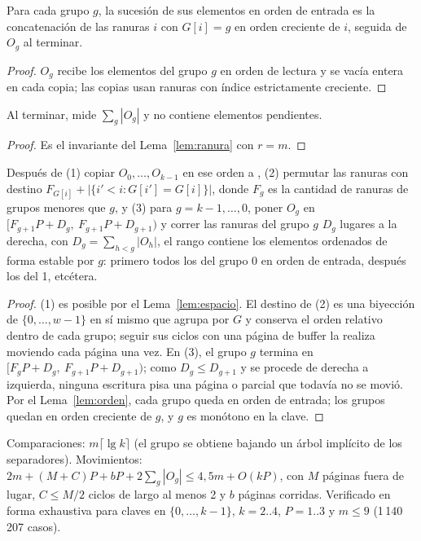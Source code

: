 \begin{lema}[orden]\label{lem:orden}
Para cada grupo $g$, la sucesión de sus elementos en orden de entrada es la concatenación de
las ranuras $i$ con $G[i]=g$ en orden creciente de $i$, seguida de $O_g$ al terminar.
\end{lema}
\begin{proof}
$O_g$ recibe los elementos del grupo $g$ en orden de lectura y se vacía entera en cada copia;
las copias usan ranuras con índice estrictamente creciente.
\end{proof}

\begin{lema}\label{lem:espacio}
Al terminar,  mide $\sum_g|O_g|$ y no contiene elementos pendientes.
\end{lema}
\begin{proof}
Es el invariante del Lema~\ref{lem:ranura} con $r=m$.
\end{proof}

\begin{teorema}\label{thm:pasada}
Después de (1) copiar $O_0,\dots,O_{k-1}$ en ese orden a , (2) permutar las
ranuras con destino $F_{G[i]}+|\{i'<i: G[i']=G[i]\}|$, donde $F_g$ es la cantidad de ranuras
de grupos menores que $g$, y (3) para $g=k-1,\dots,0$, poner $O_g$ en
$[F_{g+1}P+D_g,\ F_{g+1}P+D_{g+1})$ y correr las ranuras del grupo $g$ $D_g$ lugares a la
derecha, con $D_g=\sum_{h<g}|O_h|$, el rango contiene los elementos ordenados de forma estable
por $g$: primero todos los del grupo 0 en orden de entrada, después los del 1, etcétera.
\end{teorema}
\begin{proof}
(1) es posible por el Lema~\ref{lem:espacio}. El destino de (2) es una biyección de
$\{0,\dots,w-1\}$ en sí mismo que agrupa por $G$ y conserva el orden relativo dentro de cada
grupo; seguir sus ciclos con una página de buffer la realiza moviendo cada página una vez. En
(3), el grupo $g$ termina en $[F_gP+D_g,\ F_{g+1}P+D_{g+1})$; como $D_g\le D_{g+1}$ y se procede
de derecha a izquierda, ninguna escritura pisa una página o parcial que todavía no se movió.
Por el Lema~\ref{lem:orden}, cada grupo queda en orden de entrada; los grupos quedan en orden
creciente de $g$, y $g$ es monótono en la clave.
\end{proof}

\begin{observacion}
Comparaciones: $m\lceil\lg k\rceil$ (el grupo se obtiene bajando un árbol implícito de los
separadores). Movimientos: $2m+(M+C)P+bP+2\sum_g|O_g|\le 4{,}5m+O(kP)$, con $M$ páginas
fuera de lugar, $C\le M/2$ ciclos de largo al menos 2 y $b$ páginas corridas. Verificado en
forma exhaustiva para claves en $\{0,\dots,k-1\}$, $k=2..4$, $P=1..3$ y $m\le9$
(1\,140\,207 casos).
\end{observacion}


